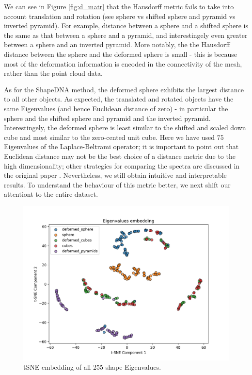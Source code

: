 \documentclass[11pt]{article}
\begin{document}
We can see in Figure \ref{fig:d_matr} that the Hausdorff metric fails to take into account translation and rotation (see sphere vs shifted sphere and pyramid vs inverted pyramid). For example, distance between a sphere and a shifted sphere is the same as that between a sphere and a pyramid, and interestingely even greater between a sphere and an inverted pyramid. More notably, the the Hausdorff distance between the sphere and the deformed sphere is small - this is because most of the deformation information is encoded in the connectivity of the mesh, rather than the point cloud data. \par

As for the ShapeDNA method, the deformed sphere exhibits the largest distance to all other objects. As expected, the translated and rotated objects have the same Eigenvalues (and hence Euclidean distance of zero) - in particular the sphere and the shifted sphere and pyramid and the inverted pyramid. Interestingely, the deformed sphere is least similar to the shifted and scaled down cube and most similar to the zero-cented unit cube. Here we have used $75$ Eigenvalues of the Laplace-Beltrami operator; it is important to point out that Euclidean distance may not be the best choice of a distance metric due to the high dimensionality; other strategies for comparing the spectra are discussed in the original paper \cite{shapedna}. Nevertheless, we still obtain intuitive and interpretable results. To understand the behaviour of this metric better, we next shift our attentiont to the entire dataset.

\begin{figure}[H]
    \centering
    \includegraphics[width=\linewidth]{../figs/results/tsne_embedding.png}  %
    \caption{tSNE embedding of all 255 shape Eigenvalues.}
    \label{fig:tsne}
\end{figure}
\end{document}
